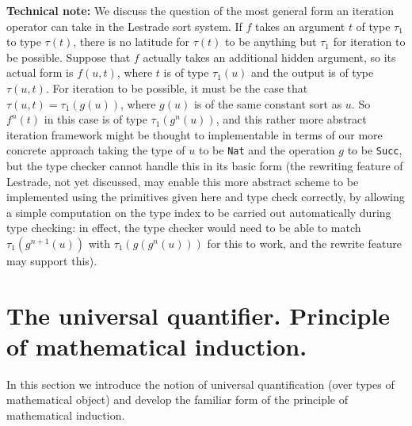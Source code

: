 \documentclass[12pt]{article}
\begin{document}
{\bf Technical note:} We discuss the question of the most general form an iteration operator can take in the Lestrade sort system.  If $f$ takes an argument $t$ of type $\tau_1$ to type $\tau(t)$,
there is no latitude for $\tau(t)$ to be anything but $\tau_1$ for iteration to be possible.  Suppose that $f$ actually takes an additional hidden argument, so its actual form
is $f(u,t)$, where $t$ is of type $\tau_1(u)$ and the output is of type $\tau(u,t)$.  For iteration to be possible, it must be the case that $\tau(u,t) = \tau_1(g(u))$, where
$g(u)$ is of the same constant sort as $u$.  So $f^n(t)$ in this case is of type $\tau_1(g^n(u))$, and this rather more abstract iteration framework might be thought to  implementable in terms of our more concrete approach taking the type of $u$ to be {\tt Nat} and the operation $g$ to be {\tt Succ}, but the type checker cannot handle this in its basic form
(the rewriting feature of Lestrade, not yet discussed, may enable this more abstract scheme to be implemented using the primitives given here and type check correctly, by allowing a simple computation on the type index to be carried out automatically during type checking:  in effect, the type checker would need to be able to match $\tau_1(g^{n+1}(u))$ with $\tau_1(g(g^n(u)))$ for this to work, and the rewrite feature may support this).

\section{The universal quantifier.  Principle of mathematical induction.}

In this section we introduce the notion of universal quantification (over types of mathematical object)  and develop the familiar form of the principle of mathematical induction.
\end{document}
